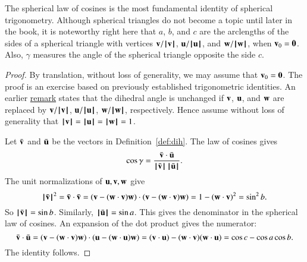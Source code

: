 The spherical law of cosines is the most fundamental identity of
spherical trigonometry.  Although spherical triangles do not become a
topic until later in the book, it is noteworthy right here that $a$,
$b$, and $c$ are the arclengths of the sides of a spherical triangle
with vertices $\v/\normo{\v}$, $\u/\normo{\u}$, and $\w/\normo{\w}$,
when $\v_0=\orz$.  Also, $\gamma$ measures the angle of the spherical
triangle opposite the side $c$.  %
%


\begin{proof} By translation, without loss of generality, we may
  assume that $\v_0=\orz$.  The proof is an exercise based on
  previously established trigonometric identities.  An earlier
  \hyperref[rem:dih]{remark} states that the dihedral angle is
  unchanged if $\v$, $\u$, and $\w$ are replaced by $\v/\normo{\v}$,
  $\u/\normo{\u}$, $\w/\normo{\w}$, respectively.  Hence assume
  without loss of generality that
  $\normo{\v}=\normo{\u}=\normo{\w}=1$.

Let $\bar \v$ and $\bar \u$ be the vectors in Definition~\ref{def:dih}.
The law of cosines gives
\begin{displaymath}\cos\gamma = \frac{\bar \v\cdot \bar \u}
{\normo{\bar \v}\,\normo{\bar \u}}.
\end{displaymath}
The unit normalizations of $\u,\v,\w$ give
\begin{displaymath}
\normo{\bar \v}^2 = \bar \v\cdot \bar \v =
(\v - (\w\cdot \v)\w)\cdot (\v - (\w\cdot \v) \w) =
1 - (\w\cdot \v)^2 = \sin^2 b.
\end{displaymath}
So $\normo{\bar \v} =\sin b$. Similarly, $\normo{\bar \u} = \sin a$.
This gives the denominator in the spherical law of cosines.  An
expansion of the dot product gives the numerator:
\begin{displaymath}
\bar \v\cdot \bar \u = (\v - (\w\cdot \v) \w)\cdot (\u - (\w\cdot \u) \w)
= (\v\cdot \u) - (\w\cdot \v) (\w\cdot \u) = \cos c - \cos
a \cos b.
\end{displaymath}
The identity follows.
\end{proof}


